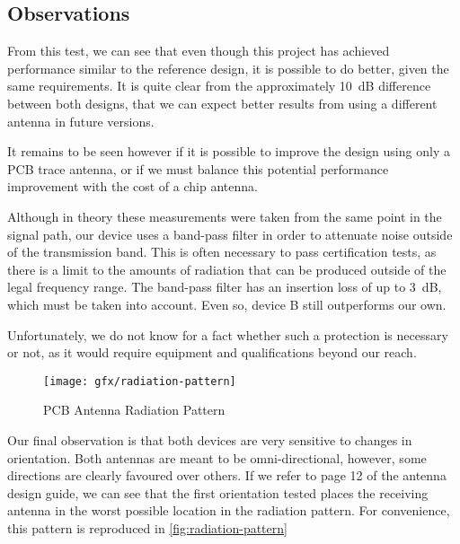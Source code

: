 \subsection{Observations}

From this test, we can see that even though this project has achieved
performance similar to the reference design, it is possible to do better, given
the same requirements. It is quite clear from the approximately \SI{10}{dB}
difference between both designs, that we can expect better results from using
a different antenna in future versions.

It remains to be seen however if it is possible to improve the design using only
a PCB trace antenna, or if we must balance this potential performance
improvement with the cost of a chip antenna.

Although in theory these measurements were taken from the same point in the
signal path, our device uses a band-pass filter in order to attenuate noise
outside of the transmission band. This is often necessary to pass certification
tests, as there is a limit to the amounts of radiation that can be produced
outside of the legal frequency range. The band-pass filter has an insertion loss
of up to \SI{3}{dB}, which must be taken into account. Even so, device B still
outperforms our own.

Unfortunately, we do not know for a fact whether such a protection is necessary
or not, as it would require equipment and qualifications beyond our reach. 

\begin{figure}[htb]
  \begin{center}
    \texttt{[image: gfx/radiation-pattern]}
  \end{center}
  \caption{PCB Antenna Radiation Pattern\citep{AN3359}}
  \label{fig:radiation-pattern}
\end{figure}

Our final observation is that both devices are very sensitive to changes in
orientation. Both antennas are meant to be omni-directional, however, some
directions are clearly favoured over others. If we refer to page 12 of the
antenna design guide\citep{AN3359}, we can see that the first orientation tested
places the receiving antenna in the worst possible location in the radiation
pattern. For convenience, this pattern is reproduced in
\autoref{fig:radiation-pattern}
